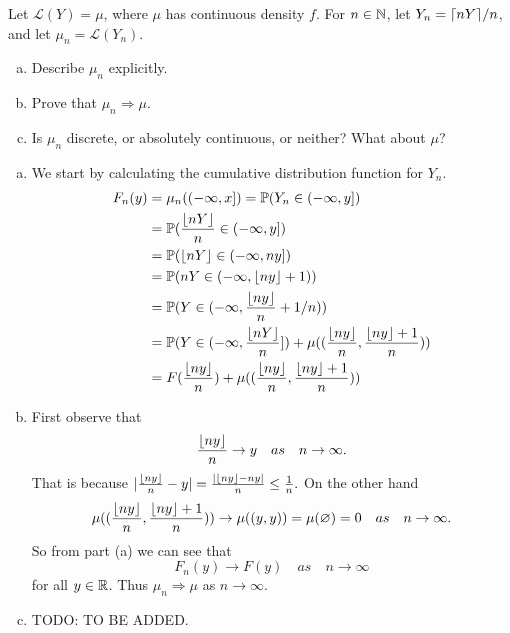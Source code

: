 \begin{problem}
	Let $ \mathcal{L}(Y) = \mu $, where $ \mu $ has continuous density $ f $. For $ n\in \mathbb{N} $, let $ Y_n = \lceil nY \rceil/n $, and let $ \mu_n = \mathcal{L}(Y_n) $.
	\begin{enumerate}[(a)]
		\item Describe $ \mu_n $ explicitly.
		\item Prove that $ \mu_n \Rightarrow \mu $.
		\item Is $ \mu_n $ discrete, or absolutely continuous, or neither? What about $ \mu $?
	\end{enumerate}
\end{problem}
\begin{solution}
	\begin{enumerate}[(a)]
		\item We start by calculating the cumulative distribution function for $ Y_n $.
		\begin{align*}
			F_n(y) &= \mu_n((-\infty,x]) = \mathbb{P}(Y_n\in(-\infty,y]) \\
			&= \mathbb{P}(\frac{\lfloor nY \rfloor}{n}\in (-\infty,y]) \\
			&= \mathbb{P}(\lfloor nY \rfloor\in (-\infty,ny]) \\
			&= \mathbb{P}(nY \in (-\infty,\lfloor ny \rfloor+1))\\
			&= \mathbb{P}(Y \in (-\infty,\frac{\lfloor ny \rfloor}{n} + 1/n))\\
			&= \mathbb{P}(Y \in (-\infty,\frac{\lfloor nY \rfloor}{n}]) + \mu((\frac{\lfloor ny \rfloor}{n},\frac{\lfloor ny \rfloor+1}{n})) \\
			&= F(\frac{\lfloor ny \rfloor}{n}) + \mu((\frac{\lfloor ny \rfloor}{n},\frac{\lfloor ny \rfloor+1}{n}))
 		\end{align*}
 		\item First observe that 
 		\[ \frac{\lfloor ny \rfloor}{n} \to y \quad as \quad n\to\infty. \]
 		That is because $ |\frac{\lfloor ny \rfloor}{n} - y| = \frac{|\lfloor ny \rfloor - ny|}{n} \leq \frac{1}{n}. $ On the other hand
 		\[ \mu((\frac{\lfloor ny \rfloor}{n},\frac{\lfloor ny \rfloor+1}{n})) \to \mu((y,y)) = \mu(\varnothing) = 0 \quad as \quad n\to\infty. \]
 		So from part (a) we can see that
 		\[ F_n(y) \to F(y) \quad as \quad n\to\infty \]
 		for all $ y\in \mathbb{R} $. Thus $ \mu_n \Rightarrow \mu $ as $ n\to\infty $.
 		\item {\color{red} \noindent TODO: TO BE ADDED.}
	\end{enumerate}
\end{solution}


